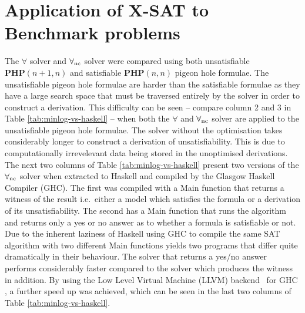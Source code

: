 \section{Application of X-SAT to Benchmark problems}
%
%
The $\forall$ solver and $\forall_{\mathrm{nc}}$ solver were compared using both unsatisfiable  $\mathbf{PHP}(n+1, n)$ and satisfiable $\mathbf{PHP}(n,n)$ pigeon hole formulae. The unsatisfiable pigeon hole formulae are harder than the satisfiable formulae as they have a large search space that must be traversed entirely by the solver in order to construct a derivation.
%
This difficulty can be seen -- compare column 2 and 3 in Table 
\ref{tab:minlog-vs-haskell} %
-- when both the $\forall$ and $\forall_{\mathrm{nc}}$ solver are applied to the unsatisfiable pigeon hole formulae. The solver without the optimisation takes considerably longer to construct a derivation of unsatisfiability. This is due to computationally irrevelevant data being stored in the unoptimised derivations. \medskip \\ 
%
%
The next two columns of Table \ref{tab:minlog-vs-haskell} present two versions of the $\forall_{\mathrm{nc}}$ solver when extracted to Haskell and compiled by the Glasgow Haskell Compiler (GHC). The first was compiled with a Main function that returns a witness of the result i.e.\ either a model which satisfies the formula or a derivation of its unsatisfiability. The second has a Main function that runs the algorithm and returns only a yes or no answer as to whether a formula is satisfiable or not. Due to the inherent laziness of Haskell using GHC to compile the same SAT algorithm with two different Main functions yields two programs that differ quite dramatically in their behaviour. The solver that returns a yes/no answer performs considerably faster compared to the solver which produces the witness in addition. By using the Low Level Virtual Machine (LLVM) backend~\cite{CL04} for GHC%
, a further speed up was achieved, which can be seen in the last two columns of Table \ref{tab:minlog-vs-haskell}.

